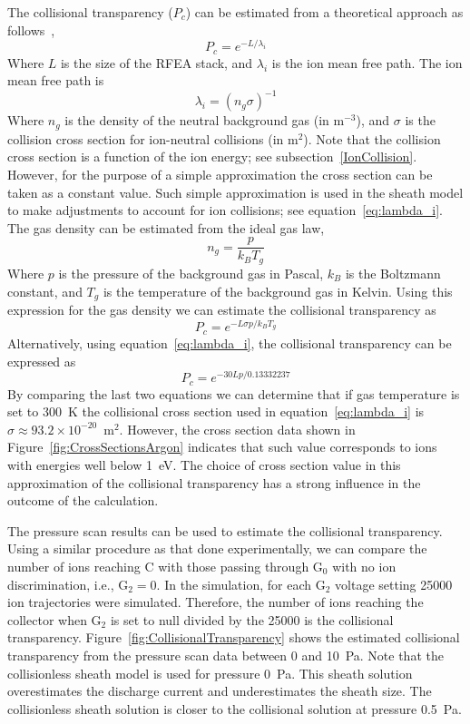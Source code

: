 The collisional transparency ($P_c$) can be estimated from a theoretical approach as follows~\cite{Baloniak2010}, 
\begin{equation}
P_c = e^{- L / \lambda_i} 
\end{equation}
Where $L$ is the size of the RFEA stack, and $\lambda_i$ is the ion mean free path. The ion mean free path is
\begin{equation}
\lambda_i = (n_g \sigma)^{-1}
\end{equation}
Where $n_g$ is the density of the neutral background gas (in m$^{-3}$), and $\sigma$ is the collision cross section for ion-neutral collisions (in m$^2$). Note that the collision cross section is a function of the ion energy; see subsection~\ref{IonCollision}. However, for the purpose of a simple approximation the cross section can be taken as a constant value. Such simple approximation is used in the sheath model to make adjustments to account for ion collisions; see equation~\ref{eq:lambda_i}. The gas density can be estimated from the ideal gas law, 
\begin{equation}
n_g = \frac{p}{k_B T_g}
\end{equation}    
Where $p$ is the pressure of the background gas in Pascal, $k_B$ is the Boltzmann constant, and $T_g$ is the temperature of the background gas in Kelvin. Using this expression for the gas density we can estimate the collisional transparency as
\begin{equation}
P_c = e^{- L \sigma p / k_B T_g}
\end{equation}
Alternatively, using equation~\ref{eq:lambda_i}, the collisional transparency can be expressed as
\begin{equation}\label{eq:CollisionalTrasparency}
P_c = e^{- 30 L p / 0.13332237}
\end{equation}
By comparing the last two equations we can determine that if gas temperature is set to 300~K the collisional cross section used in equation~\ref{eq:lambda_i} is $\sigma \approx 93.2 \times 10^{-20}$~m$^2$. However, the cross section data shown in Figure~\ref{fig:CrossSectionsArgon} indicates that such value corresponds to ions with energies well below 1~eV. The choice of cross section value in this approximation of the collisional transparency has a strong influence in the outcome of the calculation.  

The pressure scan results can be used to estimate the collisional transparency. Using a similar procedure as that done experimentally, we can compare the number of ions reaching C with those passing through G$_0$ with no ion discrimination, i.e., G$_2 =0$. In the simulation, for each G$_2$ voltage setting 25000 ion trajectories were simulated. Therefore, the number of ions reaching the collector when G$_2$ is set to null divided by the 25000 is the collisional transparency. Figure~\ref{fig:CollisionalTransparency} shows the estimated collisional transparency from the pressure scan data between 0 and 10~Pa. Note that the collisionless sheath model is used for pressure 0~Pa. This sheath solution overestimates the discharge current and underestimates the sheath size. The collisionless sheath solution is closer to the collisional solution at pressure 0.5~Pa. 

